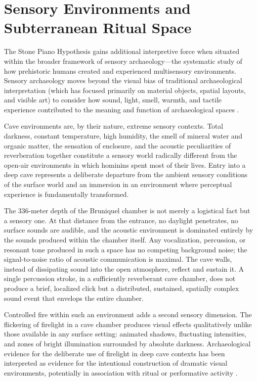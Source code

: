 \documentclass[12pt]{article}
\begin{document}
\section{Sensory Environments and Subterranean Ritual Space}

The Stone Piano Hypothesis gains additional interpretive force when situated within the broader framework of sensory archaeology—the systematic study of how prehistoric humans created and experienced multisensory environments. Sensory archaeology moves beyond the visual bias of traditional archaeological interpretation (which has focused primarily on material objects, spatial layouts, and visible art) to consider how sound, light, smell, warmth, and tactile experience contributed to the meaning and function of archaeological spaces \citep{Scarre2006}.

Cave environments are, by their nature, extreme sensory contexts. Total darkness, constant temperature, high humidity, the smell of mineral water and organic matter, the sensation of enclosure, and the acoustic peculiarities of reverberation together constitute a sensory world radically different from the open-air environments in which hominins spent most of their lives. Entry into a deep cave represents a deliberate departure from the ambient sensory conditions of the surface world and an immersion in an environment where perceptual experience is fundamentally transformed.

The 336-meter depth of the Bruniquel chamber is not merely a logistical fact but a sensory one. At that distance from the entrance, no daylight penetrates, no surface sounds are audible, and the acoustic environment is dominated entirely by the sounds produced within the chamber itself. Any vocalization, percussion, or resonant tone produced in such a space has no competing background noise; the signal-to-noise ratio of acoustic communication is maximal. The cave walls, instead of dissipating sound into the open atmosphere, reflect and sustain it. A single percussion stroke, in a sufficiently reverberant cave chamber, does not produce a brief, localized click but a distributed, sustained, spatially complex sound event that envelops the entire chamber.

Controlled fire within such an environment adds a second sensory dimension. The flickering of firelight in a cave chamber produces visual effects qualitatively unlike those available in any surface setting: animated shadows, fluctuating intensities, and zones of bright illumination surrounded by absolute darkness. Archaeological evidence for the deliberate use of firelight in deep cave contexts has been interpreted as evidence for the intentional construction of dramatic visual environments, potentially in association with ritual or performative activity \citep{Wil2019}.
\end{document}
